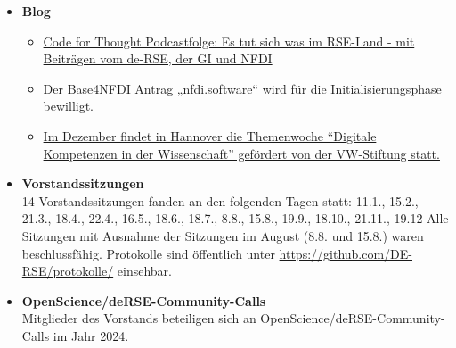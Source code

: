 \begin{itemize}
 \item[] \textbf{Blog}
 \begin{itemize}
  \item \href{https://de-rse.org/blog/2024/03/25/code-for-thought-im-rse-land.html}{Code for Thought Podcastfolge: Es tut sich was im RSE-Land - mit Beiträgen vom de-RSE, der GI und NFDI}
  \item \href{https://de-rse.org/blog/2024/07/10/nfdi-basisdienst-nfdi.software-wird-gefördert.html}{Der Base4NFDI Antrag „nfdi.software“ wird für die Initialisierungsphase bewilligt.}
  \item \href{https://de-rse.org/blog/2024/12/05/vw-symposium.html}{Im Dezember findet in Hannover die Themenwoche “Digitale Kompetenzen in der Wissenschaft” gefördert von der VW-Stiftung statt.}
 \end{itemize}
 \item[] \textbf{Vorstandssitzungen}\\
  14 Vorstandssitzungen fanden an den folgenden Tagen statt: 11.1., 15.2., 21.3., 18.4., 22.4., 16.5., 18.6., 18.7., 8.8., 15.8., 19.9., 18.10., 21.11., 19.12
  Alle Sitzungen mit Ausnahme der Sitzungen im August (8.8. und 15.8.) waren beschlussfähig.
  Protokolle sind öffentlich unter \href{https://github.com/DE-RSE/protokolle/}{https://github.com/DE-RSE/protokolle/} einsehbar.
 \item[] \textbf{OpenScience/deRSE-Community-Calls}\\
 Mitglieder des Vorstands beteiligen sich an  OpenScience/deRSE-Community-Calls im Jahr 2024.
\end{itemize}




